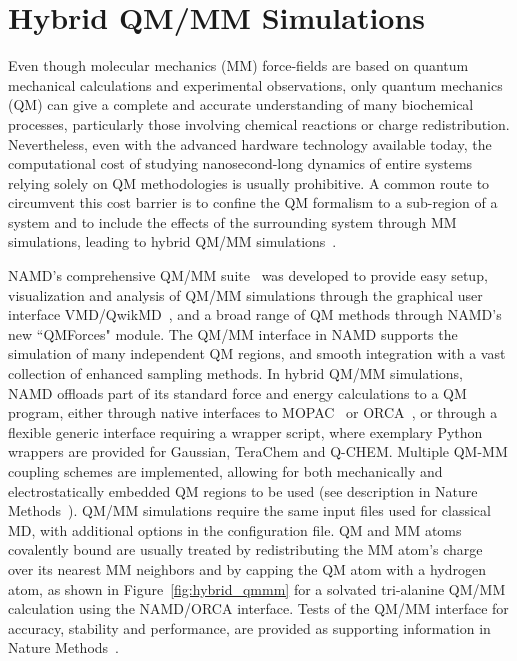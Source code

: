 
\section{Hybrid QM/MM Simulations}
\label{section:qmmm}


Even though molecular mechanics (MM) force-fields are based on
quantum mechanical calculations and experimental observations,
only quantum mechanics (QM) can give a complete and accurate
understanding of many biochemical processes, particularly those
involving chemical reactions or charge redistribution.
Nevertheless, even with the advanced hardware technology available today,
the computational cost of studying nanosecond-long dynamics of entire
systems relying solely on QM methodologies is usually prohibitive.
A common route to circumvent this cost barrier is to confine the
QM formalism to a sub-region of a system and to include the effects
of the surrounding system through MM simulations,
leading to hybrid QM/MM simulations~\cite{SENN2009}.

NAMD's comprehensive QM/MM suite~\cite{MELO2018} was developed to provide
easy setup, visualization and analysis of QM/MM simulations through
the graphical user interface VMD/QwikMD~\cite{RIBE2016},
and a broad range of QM methods through NAMD's new ``QMForces" module.
The QM/MM interface in NAMD supports the simulation of many
independent QM regions, and smooth integration with a vast collection
of enhanced sampling methods. In hybrid QM/MM simulations,
NAMD offloads part of its standard force and energy calculations
to a QM program, either through native interfaces to
MOPAC~\cite{STEW90,MAIA2012} or ORCA~\cite{NEES2012},
or through a flexible generic interface requiring a wrapper script,
where exemplary Python wrappers are provided for Gaussian,
TeraChem and Q-CHEM.
Multiple QM-MM coupling schemes are implemented, allowing for both
mechanically and electrostatically embedded QM regions to be used
(see description in Nature Methods~\cite{MELO2018}).
QM/MM simulations require the same input files used for classical MD,
with additional options in the configuration file.
QM and MM atoms covalently bound are usually treated by redistributing
the MM atom's charge over its nearest MM neighbors and by capping
the QM atom with a hydrogen atom,
as shown in Figure~\ref{fig:hybrid_qmmm} for a solvated
tri-alanine QM/MM calculation using the NAMD/ORCA interface.
Tests of the QM/MM interface for accuracy, stability and performance,
are provided as supporting information in Nature Methods~\cite{MELO2018}. 

